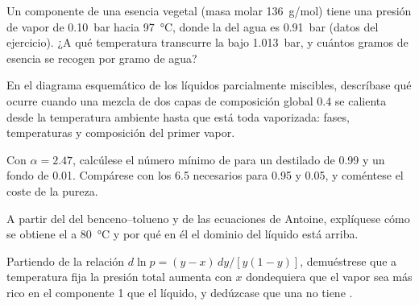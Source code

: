 \begin{exercise}[$\star\star$]\label{exo:b2:liquid-vapour-diagrams:8}
Un componente de una esencia vegetal (masa molar \qty{136}{g/mol}) tiene una presión
de vapor de \qty{0.10}{bar} hacia \qty{97}{\degreeCelsius}, donde la del agua es
\qty{0.91}{bar} (datos del ejercicio). ¿A qué temperatura transcurre la  bajo \qty{1.013}{bar}, y cuántos gramos de esencia se
recogen por gramo de agua?
\end{exercise}

\begin{exercise}[$\star\star$]\label{exo:b2:liquid-vapour-diagrams:9}
En el diagrama esquemático de los líquidos parcialmente miscibles, descríbase qué ocurre
cuando una mezcla de dos capas de composición global 0.4 se calienta desde la temperatura
ambiente hasta que está toda vaporizada: fases, temperaturas y composición
del primer vapor.
\end{exercise}

\begin{exercise}[$\star\star\star$]\label{exo:b2:liquid-vapour-diagrams:10}
Con $\alpha = 2.47$, calcúlese el número mínimo de  para un
destilado de 0.99 y un fondo de 0.01. Compárese con los 6.5 necesarios para 0.95
y 0.05, y coméntese el coste de la pureza.
\end{exercise}

\begin{exercise}[$\star\star\star$]\label{exo:b2:liquid-vapour-diagrams:11}
A partir del  del benceno--tolueno y de las ecuaciones de Antoine,
explíquese cómo se obtiene el  a \qty{80}{\degreeCelsius}
y por qué en él el dominio del líquido está arriba.
\end{exercise}

\begin{exercise}[$\star\star\star$]\label{exo:b2:liquid-vapour-diagrams:12}
Partiendo de la relación $d\ln p = (y - x)\,dy/[y(1 - y)]$, demuéstrese que a temperatura
fija la presión total aumenta con $x$ dondequiera que el vapor sea
más rico en el componente 1 que el líquido, y dedúzcase que una  no tiene
.
\end{exercise}

